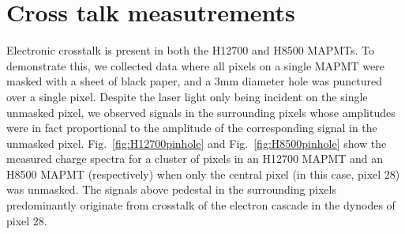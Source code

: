 \section{Cross talk measutrements}

Electronic crosstalk is present in both the H12700 and H8500 MAPMTs. To demonstrate this, we collected data where all pixels on a single MAPMT were masked with a sheet of black paper, and a 3mm diameter hole was punctured over a single pixel. Despite the laser light only being incident on the single unmasked pixel, we observed signals in the surrounding pixels whose amplitudes were in fact proportional to the amplitude of the corresponding signal in the unmasked pixel. Fig.~\ref{fig:H12700pinhole} and Fig.~\ref{fig:H8500pinhole} show the measured charge spectra for a cluster of pixels in an H12700 MAPMT and an H8500 MAPMT (respectively) when only the central pixel (in this case, pixel 28) was unmasked. The signals above pedestal in the surrounding pixels predominantly originate from crosstalk of the electron cascade in the dynodes of pixel 28. 


